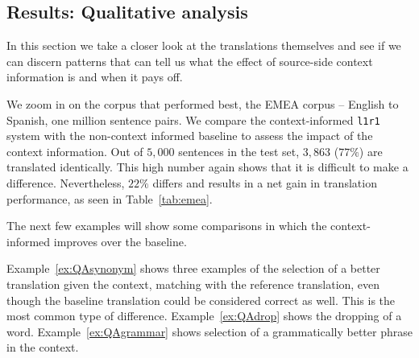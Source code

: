 \documentclass[smallextended]{svjour3}       %
\theoremstyle{break}
\begin{document}
\subsection{Results: Qualitative analysis}
\label{sec:qualanal}

In this section we take a closer look at the translations themselves and see if
we can discern patterns that can tell us what the effect of source-side context
information is and when it pays off.

We zoom in on the corpus that performed best, the EMEA corpus -- English to
Spanish, one million sentence pairs. We compare the context-informed
\texttt{l1r1} system with the non-context informed baseline to assess the
impact of the context information. Out of $5,000$ sentences in the test set,
$3,863$ ($77\%$) are translated identically. This high number again shows that
it is difficult to make a difference. Nevertheless, $22\%$ differs and results
in a net gain in translation performance, as seen in Table~\ref{tab:emea}.

The next few examples will show some comparisons in which the context-informed
improves over the baseline. 

Example~\ref{ex:QAsynonym} shows three examples of the selection of a better
translation given the context, matching with the reference translation, even
though the baseline translation could be considered correct as well. This is
the most common type of difference. Example~\ref{ex:QAdrop} shows the dropping
of a word. Example~\ref{ex:QAgrammar} shows selection of a grammatically better
phrase in the context.
\end{document}
